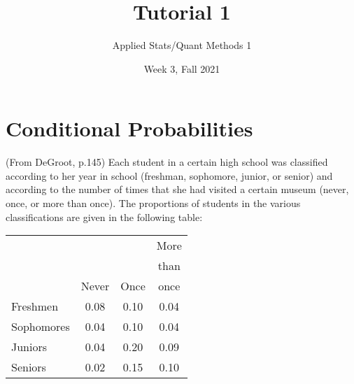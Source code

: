 \documentclass[12pt,letterpaper]{article}
\title{Tutorial 1}
\date{Week 3, Fall 2021}
\author{Applied Stats/Quant Methods 1}
\begin{document}
	\maketitle
	
%	
%

\section{Conditional Probabilities}

(From DeGroot, p.145) Each student in a certain high school was classified according to her year in school (freshman, sophomore, junior, or senior) and according to the number of times that she had visited a certain museum (never, once, or more than once).  The proportions of students in the various classifications are given in the following table:

\begin{center}
	\begin{tabular}{lccc}
		& & & More\\
		& & & than\\
		& Never & Once & once\\
		\hline
		Freshmen  & 0.08 & 0.10 & 0.04\\
		Sophomores  & 0.04 & 0.10 & 0.04\\
		Juniors		& 0.04 & 0.20 & 0.09\\
		Seniors		& 0.02 & 0.15 & 0.10\\
	\end{tabular}
\end{center}
\end{document}

